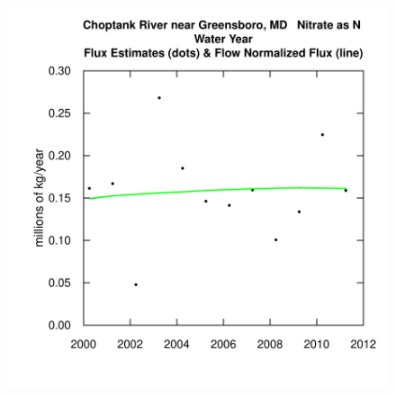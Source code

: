 \documentclass[a4paper,11pt]{article}
\begin{document}
\begin{figure}[htbp]
\begin{minipage}[h]{0.5\linewidth}
\begin{center}
\includegraphics{EGRET-figplotFluxHist}
    \label{fig:plotFluxHist}
    \end{center}
  \end{minipage}
  \caption{}
  \label{fig:plotConcHistANDplotFluxHist}
\end{figure}
\end{document}
